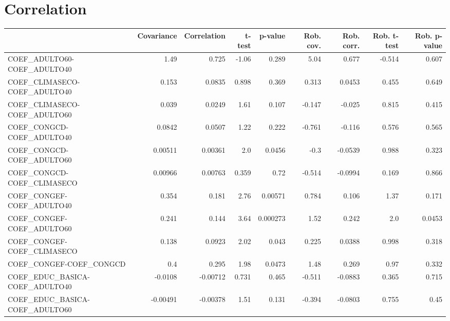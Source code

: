 \section{Correlation}
\begin{tabular}{lrrrrrrrr}
\toprule
{} &  Covariance &  Correlation &  t-test &  p-value &  Rob. cov. &  Rob. corr. &  Rob. t-test &  Rob. p-value \\
\midrule
COEF\_ADULTO60-COEF\_ADULTO40           &        1.49 &        0.725 &   -1.06 &    0.289 &       5.04 &       0.677 &       -0.514 &         0.607 \\
COEF\_CLIMASECO-COEF\_ADULTO40          &       0.153 &       0.0835 &   0.898 &    0.369 &      0.313 &      0.0453 &        0.455 &         0.649 \\
COEF\_CLIMASECO-COEF\_ADULTO60          &       0.039 &       0.0249 &    1.61 &    0.107 &     -0.147 &      -0.025 &        0.815 &         0.415 \\
COEF\_CONGCD-COEF\_ADULTO40             &      0.0842 &       0.0507 &    1.22 &    0.222 &     -0.761 &      -0.116 &        0.576 &         0.565 \\
COEF\_CONGCD-COEF\_ADULTO60             &     0.00511 &      0.00361 &     2.0 &   0.0456 &       -0.3 &     -0.0539 &        0.988 &         0.323 \\
COEF\_CONGCD-COEF\_CLIMASECO            &     0.00966 &      0.00763 &   0.359 &     0.72 &     -0.514 &     -0.0994 &        0.169 &         0.866 \\
COEF\_CONGEF-COEF\_ADULTO40             &       0.354 &        0.181 &    2.76 &  0.00571 &      0.784 &       0.106 &         1.37 &         0.171 \\
COEF\_CONGEF-COEF\_ADULTO60             &       0.241 &        0.144 &    3.64 & 0.000273 &       1.52 &       0.242 &          2.0 &        0.0453 \\
COEF\_CONGEF-COEF\_CLIMASECO            &       0.138 &       0.0923 &    2.02 &    0.043 &      0.225 &      0.0388 &        0.998 &         0.318 \\
COEF\_CONGEF-COEF\_CONGCD               &         0.4 &        0.295 &    1.98 &   0.0473 &       1.48 &       0.269 &         0.97 &         0.332 \\
COEF\_EDUC\_BASICA-COEF\_ADULTO40        &     -0.0108 &     -0.00712 &   0.731 &    0.465 &     -0.511 &     -0.0883 &        0.365 &         0.715 \\
COEF\_EDUC\_BASICA-COEF\_ADULTO60        &    -0.00491 &     -0.00378 &    1.51 &    0.131 &     -0.394 &     -0.0803 &        0.755 &          0.45 \\

\end{tabular}
